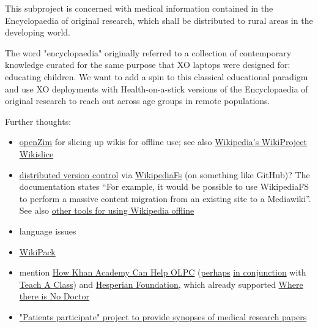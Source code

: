 \documentclass[final,authoryear,3p]{elsarticle-open-drafting}
\begin{document}
This subproject is concerned with medical information contained in the Encyclopaedia of original research, which shall be distributed to rural areas in the developing world. 

The word "encyclopaedia" originally referred to a collection of contemporary knowledge 
curated for the same purpose that XO laptops were designed for: educating children.
We want to add a spin to this classical educational paradigm and use XO deployments with Health-on-a-stick versions 
of the Encyclopaedia of original research to reach out across age groups in remote populations.


Further thoughts:

\begin{itemize}
	\item \href{http://www.openzim.org}{openZim} for slicing up wikis for offline use; see also \href{http://en.wikipedia.org/wiki/Wikipedia:WikiProject_Wikislice}{Wikipedia's WikiProject Wikislice}
	\item \href{http://lists.wikimedia.org/pipermail/foundation-l/2008-February/038623.html}{distributed version control} via \href{http://wikipediafs.sourceforge.net/}{WikipediaFs} (on something like GitHub)? The documentation states ``For example, it would be possible to use WikipediaFS to perform a massive content migration from an existing site to a Mediawiki''. See also \href{http://zikoblog.wordpress.com/2011/05/29/wikipedia-offline-2/}{other tools for using Wikipedia offline}
	\item language issues
	\item \href{http://wiki.laptop.org/go/WikiPack}{WikiPack}
	\item mention \href{http://www.olpcnews.com/content/education/how_khan_academy_can_help_olpc.html}{How Khan Academy Can Help OLPC} (\href{http://seidensj.wordpress.com/2011/06/06/next-steps-with-khan-academy-olpc-translations-sugar-activities-and-etoys-videos/}{perhaps} \href{http://blog.laptop.org/2011/06/06/khan-academy-videos-and-olpc/}{in conjunction} with \href{http://www.teachaclass.org/}{Teach A Class}) and \href{http://www.hesperian.org/publications_download.php}{Hesperian Foundation}, which already supported \href{http://site.ebrary.com/lib/hesperian/docDetail.action?docID=10411911}{Where there is No Doctor}
	\item \href{http://blogs.ukoln.ac.uk/patientsparticipate/}{"Patients participate" project to provide synopses of medical research papers}
\end{itemize}
\end{document}
